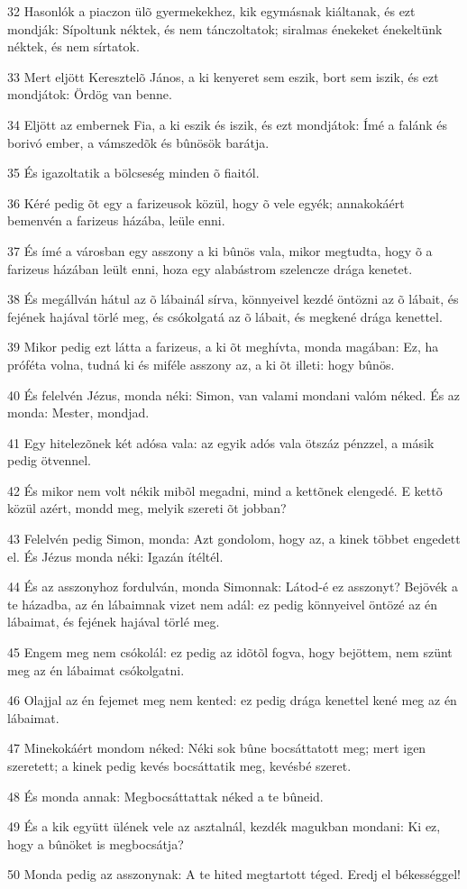 \par 32 Hasonlók a piaczon ülõ gyermekekhez, kik egymásnak kiáltanak, és ezt mondják: Sípoltunk néktek, és nem tánczoltatok; siralmas énekeket énekeltünk néktek, és nem sírtatok.
\par 33 Mert eljött Keresztelõ János, a ki kenyeret sem eszik, bort sem iszik, és ezt mondjátok: Ördög van benne.
\par 34 Eljött az embernek Fia, a ki eszik és iszik, és ezt mondjátok: Ímé a falánk és borivó ember, a vámszedõk és bûnösök barátja.
\par 35 És igazoltatik a bölcseség minden õ fiaitól.
\par 36 Kéré pedig õt egy a farizeusok közül, hogy õ vele egyék; annakokáért bemenvén a farizeus házába, leüle enni.
\par 37 És ímé a városban egy asszony a ki bûnös vala, mikor megtudta, hogy õ a farizeus házában leült enni, hoza egy alabástrom szelencze drága kenetet.
\par 38 És megállván hátul az õ lábainál sírva, könnyeivel kezdé öntözni az õ lábait, és fejének hajával törlé meg, és csókolgatá az õ lábait, és megkené drága kenettel.
\par 39 Mikor pedig ezt látta a farizeus, a ki õt meghívta, monda magában: Ez, ha próféta volna, tudná ki és miféle asszony az, a ki õt illeti: hogy bûnös.
\par 40 És felelvén Jézus, monda néki: Simon, van valami mondani valóm néked. És az monda: Mester, mondjad.
\par 41 Egy hitelezõnek két adósa vala: az egyik adós vala ötszáz pénzzel, a másik pedig ötvennel.
\par 42 És mikor nem volt nékik mibõl megadni, mind a kettõnek elengedé. E kettõ közül azért, mondd meg, melyik szereti õt jobban?
\par 43 Felelvén pedig Simon, monda: Azt gondolom, hogy az, a kinek többet engedett el. És Jézus monda néki: Igazán ítéltél.
\par 44 És az asszonyhoz fordulván, monda Simonnak: Látod-é ez asszonyt? Bejövék a te házadba, az én lábaimnak vizet nem adál: ez pedig könnyeivel öntözé az én lábaimat, és fejének hajával törlé meg.
\par 45 Engem meg nem csókolál: ez pedig az idõtõl fogva, hogy bejöttem, nem szünt meg az én lábaimat csókolgatni.
\par 46 Olajjal az én fejemet meg nem kented: ez pedig drága kenettel kené meg az én lábaimat.
\par 47 Minekokáért mondom néked: Néki sok bûne bocsáttatott meg; mert igen szeretett; a kinek pedig kevés bocsáttatik meg, kevésbé szeret.
\par 48 És monda annak: Megbocsáttattak néked a te bûneid.
\par 49 És a kik együtt ülének vele az asztalnál, kezdék magukban mondani: Ki ez, hogy a bûnöket is megbocsátja?
\par 50 Monda pedig az asszonynak: A te hited megtartott téged. Eredj el békességgel!

